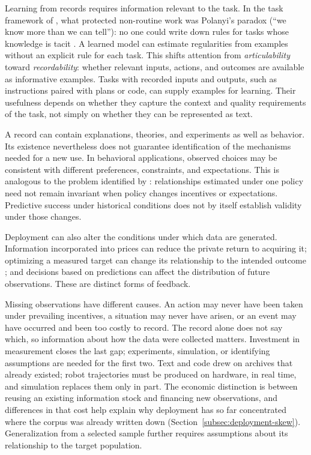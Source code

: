 \documentclass[12pt]{article}
\theoremstyle{plain}
\theoremstyle{definition}
\theoremstyle{remark}
\begin{document}
Learning from records requires information relevant to the task.
In the task framework of
\citet{AutorLevyMurnane2003}, what protected non-routine work was
Polanyi's paradox (``we know more than we can tell''): no one could
write down rules for tasks whose knowledge is tacit
\citep{Autor2014Polanyi}. A learned model can estimate regularities from examples without an
explicit rule for each task. This shifts attention from
\emph{articulability} toward \emph{recordability}: whether relevant
inputs, actions, and outcomes are available as informative examples.
Tasks with recorded inputs and outputs, such as instructions paired
with plans or code, can supply examples for learning. Their usefulness
depends on whether they capture the context and quality requirements of
the task, not simply on whether they can be represented as text.

A record can contain explanations, theories, and experiments as
well as behavior. Its existence nevertheless does not guarantee
identification of the mechanisms needed for a new use. In behavioral
applications, observed choices may be consistent with different
preferences, constraints, and expectations. This is analogous to the
problem identified by \citet{Lucas1976}: relationships estimated under
one policy need not remain invariant when policy changes incentives or
expectations. Predictive success under historical conditions does not
by itself establish validity under those changes.

Deployment can also alter the conditions under which data are generated.
Information incorporated into prices can reduce the private return to
acquiring it; optimizing a measured target
can change its relationship to the intended outcome \citep{Goodhart1975};
and decisions based on predictions can affect the distribution of future
observations. These are distinct forms of feedback.

Missing observations have different causes. An action may never have
been taken under prevailing incentives, a situation may never have
arisen, or an event may have occurred and been too costly to record.
The record alone does not say which, so information about how the data
were collected matters. Investment in measurement closes the last gap;
experiments, simulation, or identifying assumptions are needed for the
first two. Text and code drew on archives that already existed; robot
trajectories must be produced on hardware, in real time, and simulation
replaces them only in part. The economic distinction is between reusing
an existing information stock and financing new observations, and
differences in that cost help explain why deployment has so far
concentrated where the corpus was already written down
(Section~\ref{subsec:deployment-skew}). Generalization from a selected
sample further requires assumptions about its relationship to the
target population.
\end{document}
